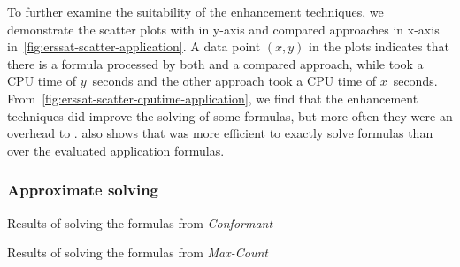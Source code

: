 To further examine the suitability of the enhancement techniques,
we demonstrate the scatter plots with \erssat in y-axis and compared approaches in x-axis
in~\cref{fig:erssat-scatter-application}.
A data point $(x,y)$ in the plots indicates that there is a formula processed by both \erssat and a compared approach,
while \erssat took a CPU time of $y$~seconds and the other approach took a CPU time of $x$~seconds.
From~\cref{fig:erssat-scatter-cputime-application},
we find that the enhancement techniques did improve the solving of some formulas,
but more often they were an overhead to \erssatb.
 also shows that
\dcssat was more efficient to exactly solve formulas than \erssat over the evaluated application formulas.

\subsubsection{Approximate solving}

\begin{table}[ht]
    \centering
    \scriptsize
    \caption{Results of solving the formulas from \textit{Conformant}}
    \label{tbl:exist-random-ssat-conformant}
    \begin{adjustbox}{angle=90}
    \end{adjustbox}
\end{table}

\begin{table}[ht]
    \centering
    \scriptsize
    \caption{Results of solving the formulas from \textit{Max-Count}}
    \label{tbl:exist-random-ssat-maxcount}
    \begin{adjustbox}{angle=90}
    \end{adjustbox}
\end{table}

